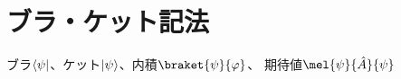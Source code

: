 \documentclass[../sotsu.tex]{subfiles}
\begin{document}
\section{ブラ・ケット記法}



ブラ$\langle\psi\rvert$、ケット$\lvert\psi\rangle$、内積$\braket{\psi}{\varphi}$、
期待値$\mel{\psi}{\hat{A}}{\psi}$
\end{document}
